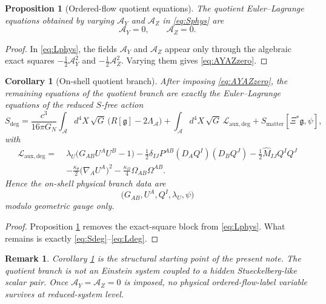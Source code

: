 \documentclass[11pt]{article}
\newcommand{\Sub}{\mathcal{A}}
\newcommand{\BridgeMetric}{\mathfrak{g}}
\newcommand{\AY}{\mathcal A_Y}
\newcommand{\AZ}{\mathcal A_Z}
\newtheorem{proposition}{Proposition}
\newtheorem{remark}{Remark}
\newtheorem{corollary}{Corollary}
\begin{document}
\begin{proposition}[Ordered-flow quotient equations]
\label{prop:AYAZ}
The quotient Euler--Lagrange equations obtained by varying \(\AY\) and \(\AZ\) in \eqref{eq:Sphys} are
\begin{equation}
\AY=0,
\qquad
\AZ=0.
\label{eq:AYAZzero}
\end{equation}
\end{proposition}

\begin{proof}
In \eqref{eq:Lphys}, the fields \(\AY\) and \(\AZ\) appear only through the algebraic exact squares \(-\frac12\AY^2\) and \(-\frac12\AZ^2\). Varying them gives \eqref{eq:AYAZzero}.
\end{proof}

\begin{corollary}[On-shell quotient branch]
\label{cor:on-shell}
After imposing \eqref{eq:AYAZzero}, the remaining equations of the quotient branch are exactly the Euler--Lagrange equations of the reduced \(S\)-free action
\begin{equation}
S_{\mathrm{deg}}
=
\frac{c^3}{16\pi G_N}
\int_{\Sub} d^4X\,\sqrt{G}\,\bigl(R[\BridgeMetric]-2\Lambda_{\Sub}\bigr)
+\int_{\Sub} d^4X\,\sqrt{G}\,\mathcal L_{\mathrm{aux,deg}}
+S_{\mathrm{matter}}[\Xi^*\BridgeMetric,\psi],
\label{eq:Sdeg}
\end{equation}
with
\begin{align}
\mathcal L_{\mathrm{aux,deg}}
=\;&
\lambda_U\bigl(G_{AB}U^AU^B-1\bigr)
-\frac12\delta_{IJ}P^{AB}(D_AQ^I)(D_BQ^J)
-\frac12\widehat M_{IJ}Q^IQ^J
\nonumber\\
&-\frac{\kappa_\theta}{2}\bigl(\nabla_AU^A\bigr)^2
-\frac{\kappa_\Omega}{4}\Omega_{AB}\Omega^{AB}.
\label{eq:Ldeg}
\end{align}
Hence the on-shell physical branch data are
\begin{equation}
\bigl(G_{AB},U^A,Q^I,\lambda_U,\psi\bigr)
\label{eq:physdata}
\end{equation}
modulo geometric gauge only.
\end{corollary}

\begin{proof}
Proposition \ref{prop:AYAZ} removes the exact-square block from \eqref{eq:Lphys}. What remains is exactly \eqref{eq:Sdeg}--\eqref{eq:Ldeg}.
\end{proof}

\begin{remark}
Corollary \ref{cor:on-shell} is the structural starting point of the present note. The quotient branch is not an Einstein system coupled to a hidden Stueckelberg-like scalar pair. Once \(\AY=\AZ=0\) is imposed, no physical ordered-flow-label variable survives at reduced-system level.
\end{remark}
\end{document}

